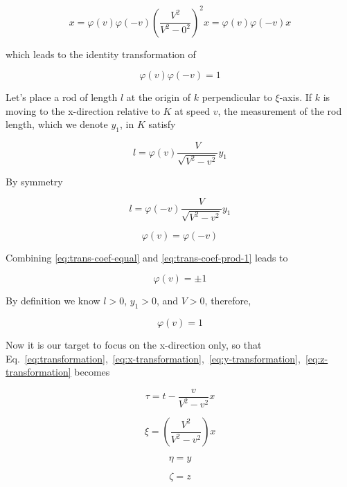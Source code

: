 \begin{equation}
    x = \varphi(v)\varphi(-v)\left( \frac{V^2}{V^2 - 0^2} \right)^2 x = \varphi(v)\varphi(-v) x
\end{equation}

which leads to the identity transformation of

\begin{equation}\label{eq:trans-coef-prod-1}
\varphi(v)\varphi(-v) = 1
\end{equation}

Let's place a rod of length $l$ at the origin of $k$ perpendicular to $\xi$-axis. If $k$ is moving to the x-direction
relative to $K$ at speed $v$, the measurement of the rod length, which we denote $y_1$, in $K$ satisfy

\begin{equation}
    l = \varphi(v)\frac{V}{\sqrt{V^2 - v^2}}y_1
\end{equation}

By symmetry

\begin{equation}
    l = \varphi(-v)\frac{V}{\sqrt{V^2 - v^2}}y_1
\end{equation}

\begin{equation}\label{eq:trans-coef-equal}
\varphi(v) = \varphi(-v)
\end{equation}

Combining \ref{eq:trans-coef-equal} and \ref{eq:trans-coef-prod-1} leads to

\begin{equation}
    \varphi(v) = \pm 1
\end{equation}

By definition we know $l > 0$, $y_1 > 0$, and $V > 0$, therefore,

\begin{equation}
    \varphi(v) = 1
\end{equation}

Now it is our target to focus on the x-direction only, so that Eq.~\ref{eq:transformation},~\ref{eq:x-transformation},~\ref{eq:y-transformation},~\ref{eq:z-transformation} becomes

\begin{equation}
    \tau = t - \frac{v}{V^2 - v^2} x
\end{equation}

\begin{equation}
    \xi = \left( \frac{V^2}{V^2 - v^2} \right) x
\end{equation}

\begin{equation}
    \eta = y
\end{equation}

\begin{equation}
    \zeta = z
\end{equation}